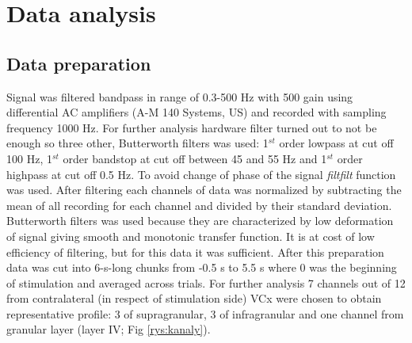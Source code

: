 \documentclass{pracalicmgr}
\begin{document}
    \chapter{Data analysis}
    
    \section{Data preparation}
    Signal was filtered bandpass in range of 0.3-500 Hz with 500 gain using differential AC amplifiers (A-M 140 Systems, US) and recorded with sampling frequency 1000 Hz. For further analysis hardware filter turned out to not be enough so three other, Butterworth filters was used: 1$^{st}$ order lowpass at cut off 100 Hz,  1$^{st}$ order bandstop at cut off between 45 and 55 Hz and  1$^{st}$ order highpass at cut off 0.5 Hz. To avoid change of phase of the signal \textit{filtfilt} function was used. After filtering each channels of data was normalized by subtracting the mean of all recording for each channel and divided by their standard deviation. Butterworth filters was used because they are characterized by low deformation of signal giving smooth and monotonic transfer function. It is at cost of low efficiency of filtering, but for this data it was sufficient. After this preparation data was cut into 6-s-long chunks from -0.5 s to 5.5 s where 0 was the beginning of stimulation and averaged across trials. For further analysis 7 channels out of 12 from contralateral (in respect of stimulation side) VCx were chosen to obtain representative profile: 3 of supragranular, 3 of infragranular and one channel from granular layer (layer IV; Fig \ref{rys:kanaly}).
    
\end{document}
